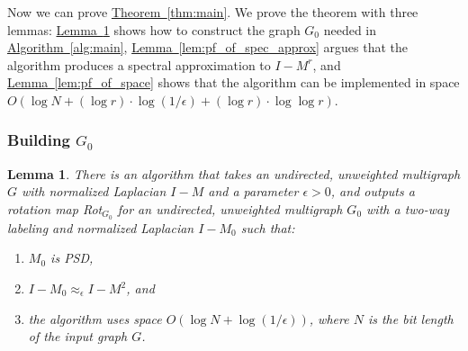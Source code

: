 \documentclass[11pt]{article}
\numberwithin{equation}{section}
\newtheorem{lemma}[theorem]{Lemma}
\theoremstyle{definition}
\theoremstyle{plain}
\newcommand{\expref}[2]{\hyperref[#2]{#1~\ref{#2}}}
\newcommand{\SC}{O(\log N + (\log r)\cdot\log(1/\epsilon)+(\log r)\cdot \log\log r)}
\numberwithin{myalgctr}{section}
\theoremstyle{named}
\begin{document}
Now we can prove \expref{Theorem}{thm:main}. We prove the theorem with three lemmas: \expref{Lemma}{lem:buildpsdG} shows how to construct the graph $G_0$ needed in \expref{Algorithm}{alg:main}, \expref{Lemma}{lem:pf_of_spec_approx} argues that the algorithm produces a spectral approximation to $I-M^r$, and \expref{Lemma}{lem:pf_of_space} shows that the algorithm can be implemented in space $\SC$. 
\subsubsection{Building \texorpdfstring{$G_0$}{G0}}
\begin{lemma}
\label{lem:buildpsdG}
There is an algorithm that takes an undirected, unweighted multigraph $G$ with normalized Laplacian $I-M$ and a parameter $\epsilon>0$, and outputs a rotation map Rot$_{G_0}$ for an undirected, unweighted multigraph $G_0$ with a two-way labeling and normalized Laplacian $I-M_0$ such that:
\begin{enumerate}
\item $M_0$ is PSD,
\item $I-M_0\approx_{\epsilon}I-M^2$, and
\item the algorithm uses space $O(\log N +\log(1/\epsilon))$, where $N$ is the bit length of the input graph $G$.
\end{enumerate}
\end{lemma}
\end{document}
